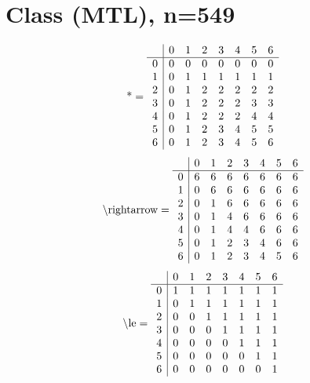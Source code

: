 \documentclass[11pt]{article}
\begin{document}
\section{Class (MTL), n=549}
\[\text{*} = 
\begin{array}{r | r r r r r r r}
 & 0 & 1 & 2 & 3 & 4 & 5 & 6 \\ \hline
0 & 0 & 0 & 0 & 0 & 0 & 0 & 0 \\
1 & 0 & 1 & 1 & 1 & 1 & 1 & 1 \\
2 & 0 & 1 & 2 & 2 & 2 & 2 & 2 \\
3 & 0 & 1 & 2 & 2 & 2 & 3 & 3 \\
4 & 0 & 1 & 2 & 2 & 2 & 4 & 4 \\
5 & 0 & 1 & 2 & 3 & 4 & 5 & 5 \\
6 & 0 & 1 & 2 & 3 & 4 & 5 & 6 \\
\end{array}
\]
\[\text{\textbackslash rightarrow} = 
\begin{array}{r | r r r r r r r}
 & 0 & 1 & 2 & 3 & 4 & 5 & 6 \\ \hline
0 & 6 & 6 & 6 & 6 & 6 & 6 & 6 \\
1 & 0 & 6 & 6 & 6 & 6 & 6 & 6 \\
2 & 0 & 1 & 6 & 6 & 6 & 6 & 6 \\
3 & 0 & 1 & 4 & 6 & 6 & 6 & 6 \\
4 & 0 & 1 & 4 & 4 & 6 & 6 & 6 \\
5 & 0 & 1 & 2 & 3 & 4 & 6 & 6 \\
6 & 0 & 1 & 2 & 3 & 4 & 5 & 6 \\
\end{array}
\]
\[\text{\textbackslash le} = 
\begin{array}{r | r r r r r r r}
 & 0 & 1 & 2 & 3 & 4 & 5 & 6 \\ \hline
0 & 1 & 1 & 1 & 1 & 1 & 1 & 1 \\
1 & 0 & 1 & 1 & 1 & 1 & 1 & 1 \\
2 & 0 & 0 & 1 & 1 & 1 & 1 & 1 \\
3 & 0 & 0 & 0 & 1 & 1 & 1 & 1 \\
4 & 0 & 0 & 0 & 0 & 1 & 1 & 1 \\
5 & 0 & 0 & 0 & 0 & 0 & 1 & 1 \\
6 & 0 & 0 & 0 & 0 & 0 & 0 & 1 \\
\end{array}
\]
\end{document}
